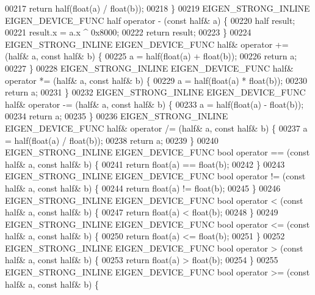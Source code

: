 \begin{DoxyCode}
00217   \textcolor{keywordflow}{return} half(\textcolor{keywordtype}{float}(a) / \textcolor{keywordtype}{float}(b));
00218 \}
00219 EIGEN\_STRONG\_INLINE EIGEN\_DEVICE\_FUNC half operator - (\textcolor{keyword}{const} half& a) \{
00220   half result;
00221   result.x = a.x ^ 0x8000;
00222   \textcolor{keywordflow}{return} result;
00223 \}
00224 EIGEN\_STRONG\_INLINE EIGEN\_DEVICE\_FUNC half& operator += (half& a, \textcolor{keyword}{const} half& b) \{
00225   a = half(\textcolor{keywordtype}{float}(a) + \textcolor{keywordtype}{float}(b));
00226   \textcolor{keywordflow}{return} a;
00227 \}
00228 EIGEN\_STRONG\_INLINE EIGEN\_DEVICE\_FUNC half& operator *= (half& a, \textcolor{keyword}{const} half& b) \{
00229   a = half(\textcolor{keywordtype}{float}(a) * \textcolor{keywordtype}{float}(b));
00230   \textcolor{keywordflow}{return} a;
00231 \}
00232 EIGEN\_STRONG\_INLINE EIGEN\_DEVICE\_FUNC half& operator -= (half& a, \textcolor{keyword}{const} half& b) \{
00233   a = half(\textcolor{keywordtype}{float}(a) - \textcolor{keywordtype}{float}(b));
00234   \textcolor{keywordflow}{return} a;
00235 \}
00236 EIGEN\_STRONG\_INLINE EIGEN\_DEVICE\_FUNC half& operator /= (half& a, \textcolor{keyword}{const} half& b) \{
00237   a = half(\textcolor{keywordtype}{float}(a) / \textcolor{keywordtype}{float}(b));
00238   \textcolor{keywordflow}{return} a;
00239 \}
00240 EIGEN\_STRONG\_INLINE EIGEN\_DEVICE\_FUNC \textcolor{keywordtype}{bool} operator == (\textcolor{keyword}{const} half& a, \textcolor{keyword}{const} half& b) \{
00241   \textcolor{keywordflow}{return} float(a) == float(b);
00242 \}
00243 EIGEN\_STRONG\_INLINE EIGEN\_DEVICE\_FUNC \textcolor{keywordtype}{bool} operator != (\textcolor{keyword}{const} half& a, \textcolor{keyword}{const} half& b) \{
00244   \textcolor{keywordflow}{return} float(a) != float(b);
00245 \}
00246 EIGEN\_STRONG\_INLINE EIGEN\_DEVICE\_FUNC \textcolor{keywordtype}{bool} operator < (\textcolor{keyword}{const} half& a, \textcolor{keyword}{const} half& b) \{
00247   \textcolor{keywordflow}{return} float(a) < float(b);
00248 \}
00249 EIGEN\_STRONG\_INLINE EIGEN\_DEVICE\_FUNC \textcolor{keywordtype}{bool} operator <= (\textcolor{keyword}{const} half& a, \textcolor{keyword}{const} half& b) \{
00250   \textcolor{keywordflow}{return} float(a) <= float(b);
00251 \}
00252 EIGEN\_STRONG\_INLINE EIGEN\_DEVICE\_FUNC \textcolor{keywordtype}{bool} operator > (\textcolor{keyword}{const} half& a, \textcolor{keyword}{const} half& b) \{
00253   \textcolor{keywordflow}{return} float(a) > float(b);
00254 \}
00255 EIGEN\_STRONG\_INLINE EIGEN\_DEVICE\_FUNC \textcolor{keywordtype}{bool} operator >= (\textcolor{keyword}{const} half& a, \textcolor{keyword}{const} half& b) \{

\end{DoxyCode}
